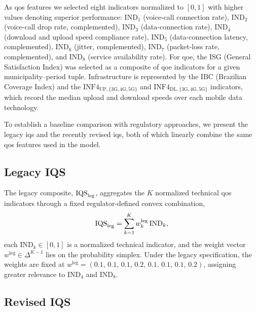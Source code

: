 \documentclass[english]{sbrt}
\begin{document}
As \gls{qos} features we selected eight indicators normalized to $[0,1]$ with higher values denoting superior performance:
$\mathrm{IND}_1$ (voice-call connection rate), 
$\mathrm{IND}_2$ (voice-call drop rate, complemented),
$\mathrm{IND}_3$ (data-connection rate),
$\mathrm{IND}_4$ (download and upload speed compliance rate),
$\mathrm{IND}_5$ (data-connection latency, complemented),
$\mathrm{IND}_6$ (jitter, complemented),
$\mathrm{IND}_7$ (packet-loss rate, complemented), and
$\mathrm{IND}_8$ (service availability rate). 
For \gls{qoe}, the $\mathrm{ISG}$ (General Satisfaction Index) was selected as a composite of \gls{qoe} indicators for a given municipality--period tuple.
Infrastructure is represented by the $\mathrm{IBC}$ (Brazilian Coverage Index)
and the $\mathrm{INF4}_{\mathrm{UP},\{\mathrm{3G,4G,5G}\}}$ and $\mathrm{INF4}_{\mathrm{DL},\{\mathrm{3G,4G,5G}\}}$ indicators, which record the median upload and download speeds over each mobile data technology.

To establish a baseline comparison with regulatory approaches, we present the legacy \gls{iqs} and the recently revised \gls{iqs}, both of which linearly combine the same \gls{qos} features used in the model.

\subsection{Legacy IQS}

The legacy composite, $\mathrm{IQS}_\mathrm{leg}$, aggregates the $K$ normalized
technical \gls{qos} indicators through a fixed regulator-defined convex
combination,
\begin{equation}
    \mathrm{IQS}_\mathrm{leg} = \sum_{k=1}^{K} w_k^{\mathrm{leg}} \, \mathrm{IND}_k,
    \label{eq:qos_leg}
\end{equation}
each $\mathrm{IND}_k \in [0,1]$ is a normalized technical indicator, and the weight vector $w^{\mathrm{leg}} \in \Delta^{K-1}$
lies on the probability simplex. Under the legacy specification, the weights are fixed at
$w^{\mathrm{leg}} = (0.1,\, 0.1,\, 0.1,\, 0.2,\, 0.1,\, 0.1,\, 0.1,\, 0.2)$,
assigning greater relevance to $\mathrm{IND}_4$ and $\mathrm{IND}_8$.


\subsection{Revised IQS}
\end{document}
